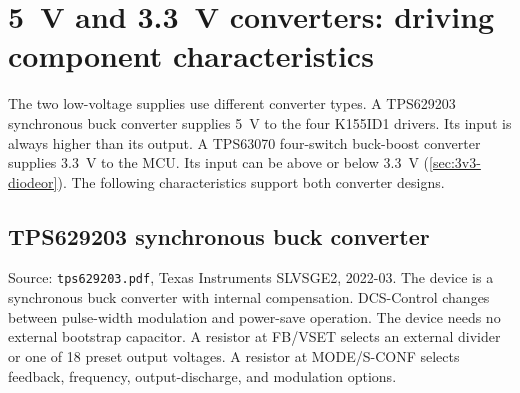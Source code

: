 \section{5~V and 3.3~V converters: driving component characteristics}
\label{sec:lv-components}

The two low-voltage supplies use different converter types. A TPS629203
synchronous buck converter supplies 5~V to the four K155ID1 drivers. Its input
is always higher than its output. A TPS63070 four-switch buck-boost converter
supplies 3.3~V to the MCU. Its input can be above or below 3.3~V
(\cref{sec:3v3-diodeor}). The following characteristics support both converter
designs.

\subsection{TPS629203 synchronous buck converter}
\label{sec:tps629203}

Source: \texttt{tps629203.pdf}, Texas Instruments SLVSGE2, 2022-03. The device
is a synchronous buck converter with internal compensation. DCS-Control changes
between pulse-width modulation and power-save operation. The device needs no
external bootstrap capacitor. A resistor at FB/VSET selects an external divider
or one of 18 preset output voltages. A resistor at MODE/S-CONF selects feedback,
frequency, output-discharge, and modulation options.

